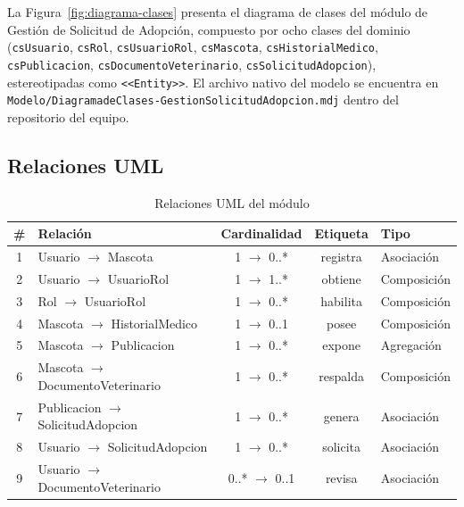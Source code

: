 \documentclass[journal,onecolumn]{IEEEtran}
\begin{document}
La Figura~\ref{fig:diagrama-clases} presenta el diagrama de clases del módulo de Gestión de Solicitud de Adopción, compuesto por ocho clases del dominio (\texttt{csUsuario}, \texttt{csRol}, \texttt{csUsuarioRol}, \texttt{csMascota}, \texttt{csHistorialMedico}, \texttt{csPublicacion}, \texttt{csDocumentoVeterinario}, \texttt{csSolicitudAdopcion}), estereotipadas como \texttt{\textless\textless{}Entity\textgreater\textgreater{}}. El archivo nativo del modelo se encuentra en \texttt{Modelo/DiagramadeClases-GestionSolicitudAdopcion.mdj} dentro del repositorio del equipo.

\subsection{Relaciones UML}

\begin{table}[H]
	\centering
	\caption{Relaciones UML del módulo}
	\label{tab:relaciones-uml}
	\begin{tabular}{|c|l|c|c|l|}
		\hline
		\textbf{\#} & \textbf{Relación} & \textbf{Cardinalidad} & \textbf{Etiqueta} & \textbf{Tipo} \\
		\hline
		1 & Usuario $\rightarrow$ Mascota              & 1 $\rightarrow$ 0..* & registra & Asociación \\
		\hline
		2 & Usuario $\rightarrow$ UsuarioRol            & 1 $\rightarrow$ 1..* & obtiene  & Composición \\
		\hline
		3 & Rol $\rightarrow$ UsuarioRol                & 1 $\rightarrow$ 0..* & habilita & Composición \\
		\hline
		4 & Mascota $\rightarrow$ HistorialMedico       & 1 $\rightarrow$ 0..1 & posee    & Composición \\
		\hline
		5 & Mascota $\rightarrow$ Publicacion           & 1 $\rightarrow$ 0..* & expone   & Agregación \\
		\hline
		6 & Mascota $\rightarrow$ DocumentoVeterinario  & 1 $\rightarrow$ 0..* & respalda & Composición \\
		\hline
		7 & Publicacion $\rightarrow$ SolicitudAdopcion & 1 $\rightarrow$ 0..* & genera   & Asociación \\
		\hline
		8 & Usuario $\rightarrow$ SolicitudAdopcion     & 1 $\rightarrow$ 0..* & solicita & Asociación \\
		\hline
		9 & Usuario $\rightarrow$ DocumentoVeterinario  & 0..* $\rightarrow$ 0..1 & revisa & Asociación \\
		\hline
	\end{tabular}
\end{table}
\end{document}
